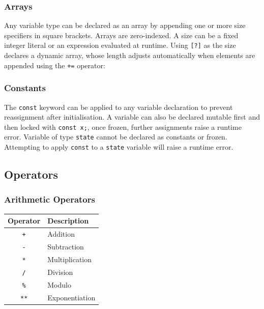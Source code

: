 \subsubsection{Arrays}

Any variable type can be declared as an array by appending one or more size
specifiers in square brackets. Arrays are zero-indexed. A size can be a fixed
integer literal or an expression evaluated at runtime. Using \texttt{[?]} as
the size declares a dynamic array, whose length adjusts automatically
when elements are appended using the \texttt{+=} operator:



\subsubsection{Constants}

The \texttt{const} keyword can be applied to any variable declaration to
prevent reassignment after initialisation. A variable can also be declared mutable
first and then locked with \texttt{const x;}, once frozen, further
assignments raise a runtime error. Variable of type \texttt{state}
cannot be declared as constants or frozen. Attempting to apply \texttt{const}
to a \texttt{state} variable will raise a runtime error.



\subsection{Operators}\label{sec:operators}

\subsubsection{Arithmetic Operators}

\begin{center}
\begin{tabular}{|c|l|}
\hline
\textbf{Operator} & \textbf{Description} \\
\hline
\texttt{+}  & Addition \\
\texttt{-}  & Subtraction \\
\texttt{*}  & Multiplication \\
\texttt{/}  & Division \\
\texttt{\%} & Modulo \\
\texttt{**} & Exponentiation \\
\hline
\end{tabular}
\end{center}

